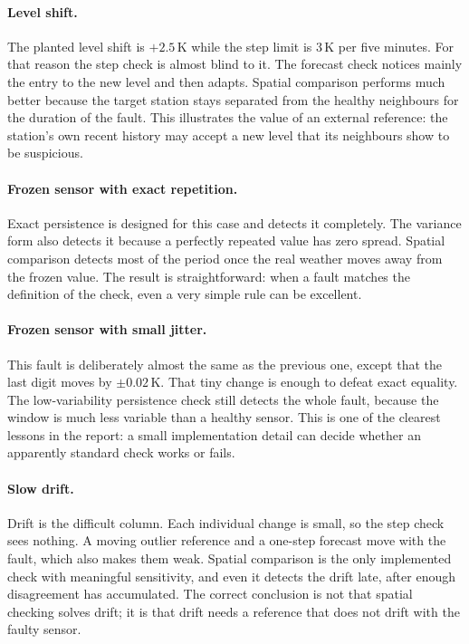 \paragraph{Level shift.}
The planted level shift is $+2.5$\,K while the step limit is 3\,K per five
minutes. For that reason the step check is almost blind to it. The forecast
check notices mainly the entry to the new level and then adapts. Spatial
comparison performs much better because the target station stays separated
from the healthy neighbours for the duration of the fault. This illustrates
the value of an external reference: the station's own recent history may
accept a new level that its neighbours show to be suspicious.

\paragraph{Frozen sensor with exact repetition.}
Exact persistence is designed for this case and detects it completely. The
variance form also detects it because a perfectly repeated value has zero
spread. Spatial comparison detects most of the period once the real weather
moves away from the frozen value. The result is straightforward: when a
fault matches the definition of the check, even a very simple rule can be
excellent.

\paragraph{Frozen sensor with small jitter.}
This fault is deliberately almost the same as the previous one, except that
the last digit moves by $\pm0.02$\,K. That tiny change is enough to defeat
exact equality. The low-variability persistence check still detects the
whole fault, because the window is much less variable than a healthy sensor.
This is one of the clearest lessons in the report: a small implementation
detail can decide whether an apparently standard check works or fails.

\paragraph{Slow drift.}
Drift is the difficult column. Each individual change is small, so the step
check sees nothing. A moving outlier reference and a one-step forecast move
with the fault, which also makes them weak. Spatial comparison is the only
implemented check with meaningful sensitivity, and even it detects the drift
late, after enough disagreement has accumulated. The correct conclusion is
not that spatial checking solves drift; it is that drift needs a reference
that does not drift with the faulty sensor.

